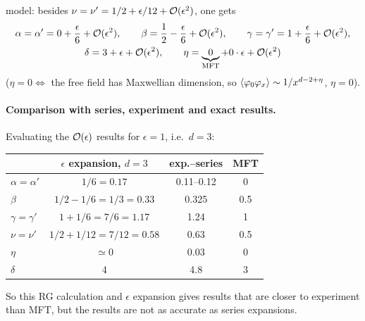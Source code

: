model: besides $\nu = \nu' = 1/2+\epsilon/12+\mathcal{O}(\epsilon^2)$, one gets
\begin{gather}
  \alpha = \alpha' = 0+\frac{\epsilon}{6}+\mathcal{O}(\epsilon^2),\qquad
  \beta = \frac{1}{2}-\frac{\epsilon}{6}+\mathcal{O}(\epsilon^2),\qquad
  \gamma = \gamma' = 1+\frac{\epsilon}{6}+\mathcal{O}(\epsilon^2),\nonumber\\
  \delta = 3+\epsilon+\mathcal{O}(\epsilon^2),\qquad
  \eta = \underbrace{0}_{\text{MFT}}+0\cdot\epsilon+\mathcal{O}(\epsilon^2)
\end{gather}
($\eta = 0\Leftrightarrow$ the free field has Maxwellian dimension, so
$\langle \varphi_0\varphi_x\rangle\sim1/x^{d-2+\eta}$, $\eta = 0$).

\paragraph{Comparison with series, experiment and exact results.}

Evaluating the $\mathcal{O}(\epsilon)$ results for $\epsilon = 1$, i.e.\ $d = 3$:
\begin{center}
\renewcommand{\arraystretch}{1.2}
\begin{tabular}{lccc}
  & $\epsilon$ expansion, $d = 3$ & exp.--series & MFT\\ \hline
  $\alpha = \alpha'$ & $1/6 = 0.17$ & 0.11--0.12 & 0\\
  $\beta$ & $1/2-1/6 = 1/3 = 0.33$ & 0.325 & 0.5\\
  $\gamma = \gamma'$ & $1+1/6 = 7/6 = 1.17$ & 1.24 & 1\\
  $\nu = \nu'$ & $1/2+1/12 = 7/12 = 0.58$ & 0.63 & 0.5\\
  $\eta$ & $\simeq 0$ & 0.03 & 0\\
  $\delta$ & 4 & 4.8 & 3
\end{tabular}
\end{center}
So this RG calculation and $\epsilon$ expansion gives results that are closer to experiment than MFT, but the
results are not as accurate as series expansions.

